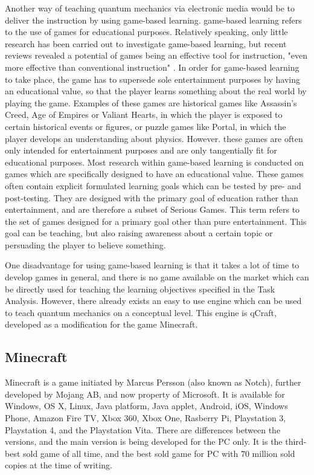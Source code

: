 \documentclass[11pt,twoside]{report} %
\begin{document}
Another way of teaching quantum mechanics via electronic media would be to deliver the instruction by using game-based learning. game-based learning refers to the use of games for educational purposes. Relatively speaking, only little research has been carried out to investigate game-based learning, but recent reviews revealed a potential of games being an effective tool for instruction, "even more effective than conventional instruction" \cite[p.~1]{wouters}. In order for game-based learning to take place, the game has to supersede sole entertainment purposes by having an educational value, so that the player learns something about the real world by playing the game. Examples of these games are historical games like Assassin's Creed, Age of Empires or Valiant Hearts, in which the player is exposed to certain historical events or figures, or puzzle games like Portal, in which the player develops an understanding about physics. However. these games are often only intended for entertainment purposes and are only tangentially fit for educational purposes. Most research within game-based learning is conducted on games which are specifically designed to have an educational value. These games often contain explicit formulated learning goals which can be tested by pre- and post-testing. They are designed with the primary goal of education rather than entertainment, and are therefore a subset of Serious Games. This term refers to the set of games designed for a primary goal other than pure entertainment. This goal can be teaching, but also raising awareness about a certain topic or persuading the player to believe something.

One disadvantage for using game-based learning is that it takes a lot of time to develop games in general, and there is no game available on the market which can be directly used for teaching the learning objectives specified in the Task Analysis. However, there already exists an easy to use engine which can be used to teach quantum mechanics on a conceptual level. This engine is qCraft, developed as a modification for the game Minecraft.

\subsection{Minecraft}

Minecraft is a game initiated by Marcus Persson (also known as Notch), further developed by Mojang AB, and now property of Microsoft. It is available for Windows, OS X, Linux, Java platform, Java applet, Android, iOS, Windows Phone, Amazon Fire TV, Xbox 360, Xbox One, Rasberry Pi, Playstation 3, Playstation 4, and the Playstation Vita. There are differences between the versions, and the main version is being developed for the PC only. It is the third-best sold game of all time, and the best sold game for PC with 70 million sold copies at the time of writing.
\end{document}
